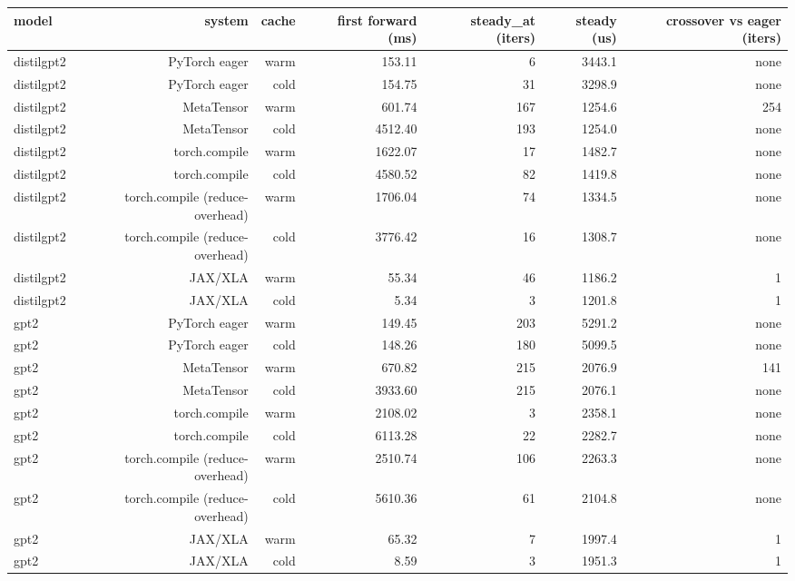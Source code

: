 \begin{tabular}{lrrrrrr}
\toprule
model & system & cache & first forward (ms) & steady\_at (iters) & steady (us) & crossover vs eager (iters) \\
\midrule
distilgpt2 & PyTorch eager & warm & 153.11 & 6 & 3443.1 & none \\
distilgpt2 & PyTorch eager & cold & 154.75 & 31 & 3298.9 & none \\
distilgpt2 & MetaTensor & warm & 601.74 & 167 & 1254.6 & 254 \\
distilgpt2 & MetaTensor & cold & 4512.40 & 193 & 1254.0 & none \\
distilgpt2 & torch.compile & warm & 1622.07 & 17 & 1482.7 & none \\
distilgpt2 & torch.compile & cold & 4580.52 & 82 & 1419.8 & none \\
distilgpt2 & torch.compile (reduce-overhead) & warm & 1706.04 & 74 & 1334.5 & none \\
distilgpt2 & torch.compile (reduce-overhead) & cold & 3776.42 & 16 & 1308.7 & none \\
distilgpt2 & JAX/XLA & warm & 55.34 & 46 & 1186.2 & 1 \\
distilgpt2 & JAX/XLA & cold & 5.34 & 3 & 1201.8 & 1 \\
gpt2 & PyTorch eager & warm & 149.45 & 203 & 5291.2 & none \\
gpt2 & PyTorch eager & cold & 148.26 & 180 & 5099.5 & none \\
gpt2 & MetaTensor & warm & 670.82 & 215 & 2076.9 & 141 \\
gpt2 & MetaTensor & cold & 3933.60 & 215 & 2076.1 & none \\
gpt2 & torch.compile & warm & 2108.02 & 3 & 2358.1 & none \\
gpt2 & torch.compile & cold & 6113.28 & 22 & 2282.7 & none \\
gpt2 & torch.compile (reduce-overhead) & warm & 2510.74 & 106 & 2263.3 & none \\
gpt2 & torch.compile (reduce-overhead) & cold & 5610.36 & 61 & 2104.8 & none \\
gpt2 & JAX/XLA & warm & 65.32 & 7 & 1997.4 & 1 \\
gpt2 & JAX/XLA & cold & 8.59 & 3 & 1951.3 & 1 \\
\bottomrule
\end{tabular}
